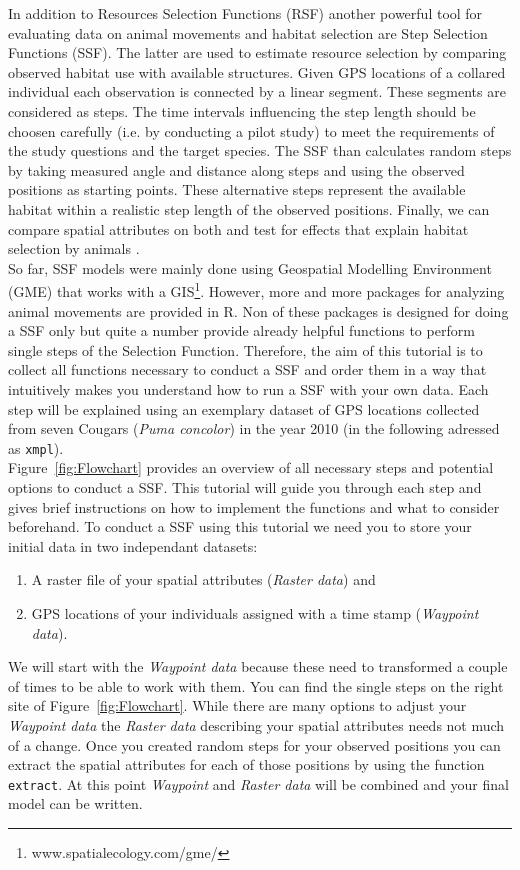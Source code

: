 \documentclass[11pt, a4paper]{article}\usepackage[]{graphicx}\usepackage[]{color}
\begin{document}
In addition to Resources Selection Functions (RSF) another powerful tool for evaluating data on animal movements and habitat selection are Step Selection Functions (SSF). The latter are used to estimate resource selection by comparing observed habitat use with available structures. Given GPS locations of a collared individual each observation is connected by a linear segment. These segments are considered as steps. The time intervals influencing the step length should be choosen carefully (i.e. by conducting a pilot study) to meet the requirements of the study questions and the target species. The SSF than calculates random steps by taking measured angle and distance along steps and using the observed positions as starting points. These alternative steps represent the available habitat within a realistic step length of the observed positions. Finally, we can compare spatial attributes on  both and test for effects that explain habitat selection by animals \cite{thurfjell2014applications}.\\ So far, SSF models were mainly done using Geospatial Modelling Environment (GME) that works with a GIS\footnote{www.spatialecology.com/gme/}. However, more and more packages for analyzing animal movements are provided in R. Non of these packages is designed for doing a SSF only but quite a number provide already helpful functions to perform single steps of the Selection Function. Therefore, the aim of this tutorial is to collect all functions necessary to conduct a SSF and order them in a  way that intuitively makes you understand how to run a SSF with your own data. Each step will be explained using an exemplary dataset of GPS locations collected from seven Cougars (\textit{Puma concolor}) in the year 2010 (in the following adressed as \texttt{xmpl}).\\


Figure~\ref{fig:Flowchart} provides an overview of all necessary steps and potential options to conduct a SSF. This tutorial will guide you through each step and gives brief instructions on how to implement the functions and what to consider beforehand.
To conduct a SSF using this tutorial we need you to store your initial data  in two independant datasets: \begin{enumerate} \item {A raster file of your spatial attributes (\emph{Raster data})} and \item{GPS locations of your individuals assigned with a time stamp (\emph{Waypoint data})}. \end{enumerate} 
We will start with the \emph{Waypoint data} because these need to transformed a couple of times to be able to work with them. You can find the single steps on the right site of Figure~\ref{fig:Flowchart}. While there are many options to adjust your \emph{Waypoint data} the \emph{Raster data} describing your spatial attributes needs not much of a change. Once you created random steps for your observed positions you can extract the spatial attributes for each of those positions by using the function \texttt{extract}. At this point \emph{Waypoint} and \emph{Raster data} will be combined and your final model can be written.   
\end{document}
